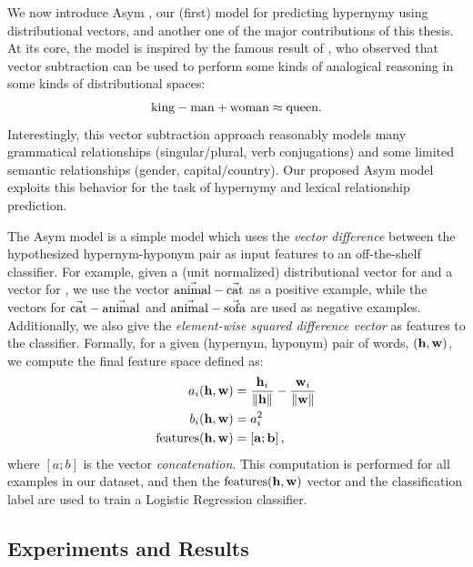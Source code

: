 We now introduce Asym \cite{roller:2014:coling}, our (first) model for
predicting hypernymy using distributional vectors, and another one of the major
contributions of this thesis. At its core, the model is
inspired by the famous result of , who observed that
vector subtraction can be used to perform some kinds of analogical reasoning in
some kinds of distributional spaces:
\begin{equation*}
  \mathbf{\text{king}} - \mathbf{\text{man}} + \mathbf{\text{woman}} \approx \mathbf{\text{queen}}.
\end{equation*}
Interestingly, this vector subtraction approach reasonably models many
grammatical relationships (singular/plural, verb conjugations) and some limited
semantic relationships (gender, capital/country). Our proposed Asym model
exploits this behavior for the task of hypernymy and lexical relationship
prediction.

The Asym model is a simple model which uses the {\em vector difference} between
the hypothesized hypernym-hyponym pair as input features to an off-the-shelf
classifier. For example, given a (unit normalized) distributional vector for
 and a vector for , we use the vector
$\vec{\mbox{animal}} - \vec{\mbox{cat}}$ as a positive example, while the
vectors for $\vec{\mbox{cat}} - \vec{\mbox{animal}}$ and
$\vec{\mbox{animal}} - \vec{\mbox{sofa}}$ are used as negative examples. Additionally,
we also give the {\em element-wise squared difference vector} as features to
the classifier. Formally, for a given (hypernym, hyponym) pair of words,
$({\mathbf{h}}, {\mathbf{w}})$, we compute the final feature space defined as:
\begin{align}
\begin{split}
  a_i({\mathbf{h}}, {\mathbf{w}}) & = \frac{{\mathbf{h}}_i}{\lVert {\mathbf{h}} \rVert} - \frac{{\mathbf{w}}_i}{\lVert {\mathbf{w}} \rVert}\\
  b_i({\mathbf{h}}, {\mathbf{w}}) & = a_i^2\\
  \mbox{features}({\mathbf{h}}, {\mathbf{w}}) & = \left[{\mathbf{a}}; {\mathbf{b}}\right],
\end{split}
\label{eqn:asym}
\end{align}
where $[a; b]$ is the vector {\em concatenation}. This computation
is performed for all examples in our dataset, and then the $\mbox{features}({\mathbf{h}}, {\mathbf{w}})$
vector and the classification label are used to train a Logistic Regression
classifier.

\subsection{Experiments and Results}

